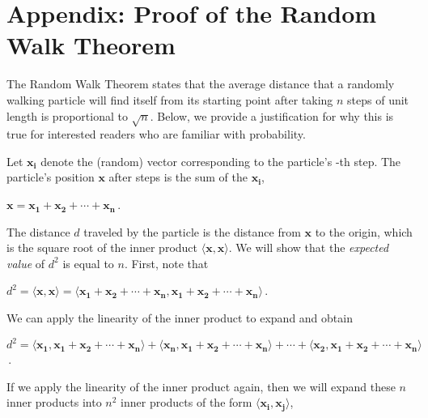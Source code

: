 \chapter[Appendix: Proof of the Random Walk Theorem]{Appendix: Proof of the Random Walk Theorem}
\label{chapter:random_walk_theorem}
\renewcommand{\chaptertitle}{Appendix: Proof of the Random Walk Theorem}

The Random Walk Theorem states that the average distance that a randomly walking particle will find itself from its starting point after taking $n$ steps of unit length is proportional to $\sqrt{n}$. Below, we provide a justification for why this is true for interested readers who are familiar with probability.

Let $\mathbf{x_i}$ denote the (random) vector corresponding to the particle's -th step. The particle's position $\mathbf{x}$ after  steps is the sum of the $\mathbf{x_i}$,

\begin{center}
$\mathbf{x} = \mathbf{x_1} + \mathbf{x_2} + \cdots + \mathbf{x_n}$\,.
\end{center}

The distance $d$ traveled by the particle is the distance from $\mathbf{x}$ to the origin, which is the square root of the inner product $\langle \mathbf{x}, \mathbf{x} \rangle$. We will show that the \textit{expected value} of $d^2$ is equal to $n$. First, note that

\begin{center}
$d^2 = \langle \mathbf{x}, \mathbf{x} \rangle = \langle \mathbf{x_1} + \mathbf{x_2} + \cdots + \mathbf{x_n}, \mathbf{x_1} + \mathbf{x_2} + \cdots + \mathbf{x_n} \rangle$\,.
\end{center}

\noindent We can apply the linearity of the inner product to expand and obtain
\begin{center}
$d^2 = \langle \mathbf{x_1}, \mathbf{x_1} + \mathbf{x_2} + \cdots + \mathbf{x_n} \rangle + \langle \mathbf{x_n}, \mathbf{x_1} + \mathbf{x_2} + \cdots + \mathbf{x_n} \rangle + \cdots + \langle \mathbf{x_2}, \mathbf{x_1} + \mathbf{x_2} + \cdots + \mathbf{x_n} \rangle$\,.
\end{center}

\noindent If we apply the linearity of the inner product again, then we will expand these $n$ inner products into $n^2$ inner products of the form $\langle \mathbf{x_i}, \mathbf{x_j} \rangle$,

